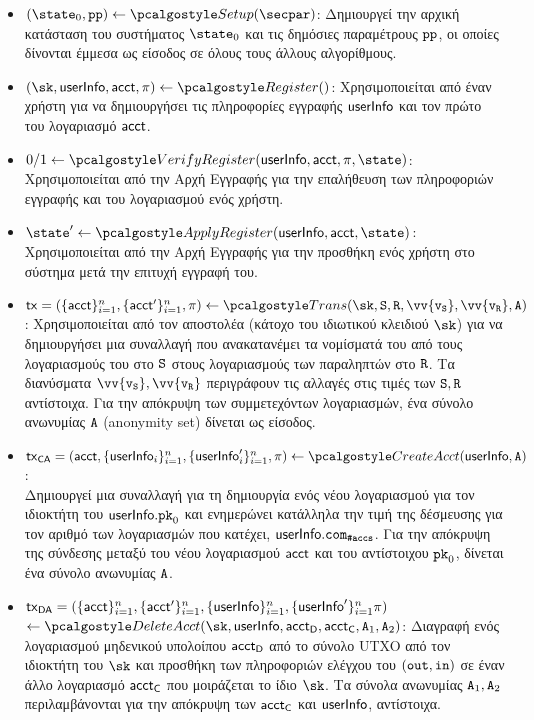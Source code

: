 \begin{itemize}
    \item $(\instate, \params) \gets \setup(\secpar)$: 
    Δημιουργεί την αρχική κατάσταση του συστήματος $\instate$ και τις δημόσιες παραμέτρους $\textup{\texttt{{pp}}}$, οι οποίες δίνονται έμμεσα ως είσοδος σε όλους τους άλλους αλγορίθμους.

    \item $(\sk, \userinfo, \acct, \pi) \gets \reg()$: 
    Χρησιμοποιείται από έναν χρήστη για να δημιουργήσει τις πληροφορίες εγγραφής $\textup{\textsf{userInfo}}$ και τον πρώτο του λογαριασμό $\textup{\textsf{acct}}$.

    \item $0/1 \gets \verreg(\userinfo, \acct, \pi, \state)$: 
        Χρησιμοποιείται από την Αρχή Εγγραφής για την επαλήθευση των πληροφοριών εγγραφής και του λογαριασμού ενός χρήστη.

    \item $\state' \gets \applyreg(\userinfo, \acct, \state)$:
    Χρησιμοποιείται από την Αρχή Εγγραφής για την προσθήκη ενός χρήστη στο σύστημα μετά την επιτυχή εγγραφή του.
    
    \item $\txn = (\{\acct\}_{i=1}^n, \{{\acct}'\}_{i=1}^n, \pi) \gets \trans(\sk,\sset, \rset, \vv{\v_\sset}, \vv{\v_\rset}, \anset)$:
    Χρησιμοποιείται από τον αποστολέα (κάτοχο του ιδιωτικού κλειδιού $\sk$) για να δημιουργήσει μια συναλλαγή που ανακατανέμει τα νομίσματά του από τους λογαριασμούς του στο $\mathtt{S}$ στους λογαριασμούς των παραληπτών στο $\mathtt{R}$. Τα διανύσματα $\vv{\v_\sset},\vv{\v_\rset}$ περιγράφουν τις αλλαγές στις τιμές των $\mathtt{S}, \mathtt{R}$ αντίστοιχα. Για την απόκρυψη των συμμετεχόντων λογαριασμών, ένα σύνολο ανωνυμίας ${\mathtt{A}}$ (anonymity set) δίνεται ως είσοδος.

    \item $\txnca = (\acct, \{\userinfo_i\}_{i=1}^n, \{\userinfo_i^\prime\}_{i=1}^n, \pi)\gets \createAcct(\userinfo, \anset)$: \\
    Δημιουργεί μια συναλλαγή για τη δημιουργία ενός νέου λογαριασμού για τον ιδιοκτήτη του $\textup{\textsf{userInfo}}.\textup{\texttt{pk}}_{0}$ και ενημερώνει κατάλληλα την τιμή της δέσμευσης για τον αριθμό των λογαριασμών που κατέχει, $\textup{\textsf{userInfo}}.\texttt{com}_{\textup{\texttt{\#accs}}}$.
    Για την απόκρυψη της σύνδεσης μεταξύ του νέου λογαριασμού $\textup{\textsf{acct}}$ και του αντίστοιχου $\textup{\texttt{pk}}_{0}$, δίνεται ένα σύνολο ανωνυμίας ${\mathtt{A}}$.

    \item $\textup{\textsf{tx}}_\textsf{DA} = (\{\textup{\textsf{acct}}\}_{i=1}^n, \{{\textup{\textsf{acct}}}'\}_{i=1}^n, \{\textup{\textsf{userInfo}}\}_{i=1}^n, \{{\textup{\textsf{userInfo}}}'\}_{i=1}^n  \pi)$\\ $\gets \deleteAcct(\sk, \userinfo, \accttodelete, \accttotransfer, \anset_1, \anset_2)$: 
    Διαγραφή ενός λογαριασμού μηδενικού υπολοίπου $\textup{\textsf{acct}}_\textsf{D}$ από το σύνολο UTXO από τον ιδιοκτήτη του $\sk$ και προσθήκη των πληροφοριών ελέγχου του $(\textup{\texttt{{out}}}, \textup{\texttt{{in}}})$ σε έναν άλλο λογαριασμό $\textup{\textsf{acct}}_\textsf{C}$ που μοιράζεται το ίδιο $\sk$. Τα σύνολα ανωνυμίας ${\mathtt{A}}_1, {\mathtt{A}}_2$ περιλαμβάνονται για την απόκρυψη των $\textup{\textsf{acct}}_\textsf{C}$ και $\textup{\textsf{userInfo}}$, αντίστοιχα.


\end{itemize}
